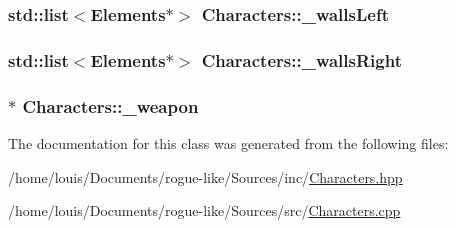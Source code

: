\hypertarget{class_characters_a7a12ea35974e9b9d5fce08b194c37df0}{
\subsubsection[{\-\_\-walls\-Left}]{\setlength{\rightskip}{0pt plus 5cm}std\-::list$<${\bf Elements}$\ast$$>$ Characters\-::\-\_\-walls\-Left\hspace{0.3cm}{\ttfamily [protected]}}}\label{class_characters_a7a12ea35974e9b9d5fce08b194c37df0}
\hypertarget{class_characters_a60b4de9d954c3de8093bfce23e0e0cec}{
\subsubsection[{\-\_\-walls\-Right}]{\setlength{\rightskip}{0pt plus 5cm}std\-::list$<${\bf Elements}$\ast$$>$ Characters\-::\-\_\-walls\-Right\hspace{0.3cm}{\ttfamily [protected]}}}\label{class_characters_a60b4de9d954c3de8093bfce23e0e0cec}
\hypertarget{class_characters_aee5f545db9a5e0ee19af66dc0754b602}{
\subsubsection[{\-\_\-weapon}]{$\ast$ Characters\-::\-\_\-weapon\hspace{0.3cm}{\ttfamily [protected]}}}\label{class_characters_aee5f545db9a5e0ee19af66dc0754b602}


The documentation for this class was generated from the following files\-:\begin{DoxyCompactItemize}
\item 
/home/louis/\-Documents/rogue-\/like/\-Sources/inc/\hyperlink{_characters_8hpp}{Characters.\-hpp}\item 
/home/louis/\-Documents/rogue-\/like/\-Sources/src/\hyperlink{_characters_8cpp}{Characters.\-cpp}\end{DoxyCompactItemize}
